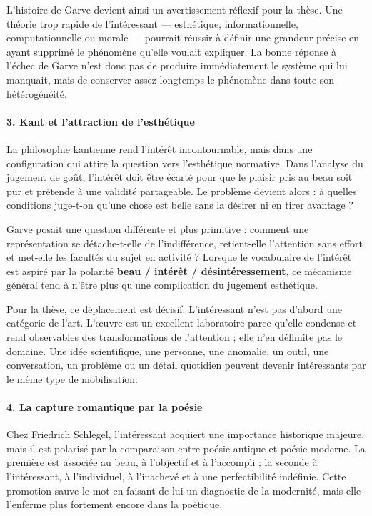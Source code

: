 \documentclass[10pt,a4paper]{article}
\begin{document}
L'histoire de Garve devient ainsi un avertissement réflexif pour la thèse. Une théorie trop rapide de l'intéressant — esthétique, informationnelle, computationnelle ou morale — pourrait réussir à définir une grandeur précise en ayant supprimé le phénomène qu'elle voulait expliquer. La bonne réponse à l'échec de Garve n'est donc pas de produire immédiatement le système qui lui manquait, mais de conserver assez longtemps le phénomène dans toute son hétérogénéité.

\paragraph{3. Kant et l'attraction de l'esthétique}
La philosophie kantienne rend l'intérêt incontournable, mais dans une configuration qui attire la question vers l'esthétique normative. Dans l'analyse du jugement de goût, l'intérêt doit être écarté pour que le plaisir pris au beau soit pur et prétende à une validité partageable. Le problème devient alors : à quelles conditions juge-t-on qu'une chose est belle sans la désirer ni en tirer avantage ?

Garve posait une question différente et plus primitive : comment une représentation se détache-t-elle de l'indifférence, retient-elle l'attention sans effort et met-elle les facultés du sujet en activité ? Lorsque le vocabulaire de l'intérêt est aspiré par la polarité \textbf{beau / intérêt / désintéressement}, ce mécanisme général tend à n'être plus qu'une complication du jugement esthétique.

Pour la thèse, ce déplacement est décisif. L'intéressant n'est pas d'abord une catégorie de l'art. L'œuvre est un excellent laboratoire parce qu'elle condense et rend observables des transformations de l'attention ; elle n'en délimite pas le domaine. Une idée scientifique, une personne, une anomalie, un outil, une conversation, un problème ou un détail quotidien peuvent devenir intéressants par le même type de mobilisation.

\paragraph{4. La capture romantique par la poésie}
Chez Friedrich Schlegel, l'intéressant acquiert une importance historique majeure, mais il est polarisé par la comparaison entre poésie antique et poésie moderne. La première est associée au beau, à l'objectif et à l'accompli ; la seconde à l'intéressant, à l'individuel, à l'inachevé et à une perfectibilité indéfinie. Cette promotion sauve le mot en faisant de lui un diagnostic de la modernité, mais elle l'enferme plus fortement encore dans la poétique.
\end{document}
